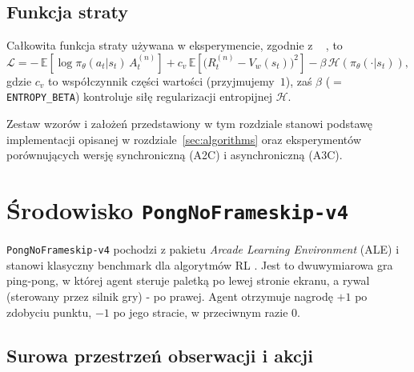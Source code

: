 \documentclass[12pt,a4paper]{article}
\newcommand{\E}{\mathbb{E}}
\begin{document}
\subsection{Funkcja straty}

Całkowita funkcja straty używana w eksperymencie, zgodnie
z
~\cite{Mnih2016A3C,Lapan2018}
, to
\begin{equation}
  \mathcal{L}
  = -\,\E\!\left[\log\pi_\theta(a_t|s_t)\,A^{(n)}_t\right]
    +c_v\,\E\!\left[\bigl(R^{(n)}_t-V_w(s_t)\bigr)^2\right]
    -\beta\,\mathcal{H}\!\left(\pi_\theta(\cdot|s_t)\right),
\end{equation}
gdzie $c_v$ to współczynnik części wartości (przyjmujemy~$1$),
zaś $\beta$ ($=$\texttt{ENTROPY\_BETA}) kontroluje siłę
regularizacji entropijnej $\mathcal{H}$.

\bigskip
Zestaw wzorów i założeń przedstawiony w tym rozdziale stanowi podstawę
implementacji opisanej w rozdziale~\ref{sec:algorithms}
oraz eksperymentów porównujących wersję synchroniczną (A2C)
i asynchroniczną (A3C).


\section{Środowisko \texttt{PongNoFrameskip-v4}}
\label{sec:pong}

\texttt{PongNoFrameskip-v4} pochodzi z pakietu \emph{Arcade Learning
Environment} (ALE) i stanowi klasyczny benchmark dla algorytmów RL  
\cite{Mnih2016A3C,Lapan2018}.  
Jest to dwuwymiarowa gra ping-pong, w której agent steruje paletką
po lewej stronie ekranu, a rywal (sterowany przez silnik gry) -
po prawej.  
Agent otrzymuje nagrodę $+1$ po zdobyciu punktu, $-1$ po jego stracie,
w przeciwnym razie $0$.

\subsection{Surowa przestrzeń obserwacji i akcji}
\end{document}
